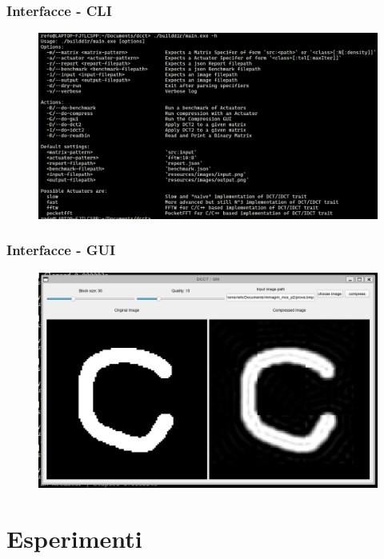 \documentclass{beamer}
\begin{document}
\begin{frame}
\frametitle{Interfacce - CLI}
\begin{figure}
  \centering
  \includegraphics[width=\linewidth]{images/interface-cli.png}
\end{figure}
\end{frame}

\begin{frame}
\frametitle{Interfacce - GUI}
\begin{figure}
  \centering
  \includegraphics[width=\linewidth]{images/interface-gui.png}
\end{figure}
\end{frame}

\section{Esperimenti}
\end{document}
